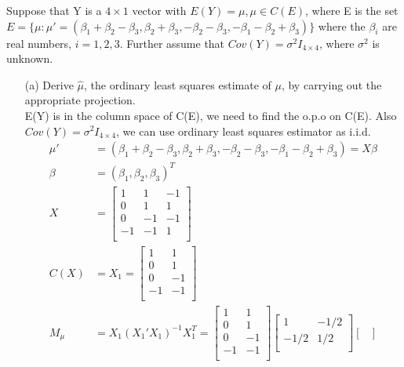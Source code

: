 Suppose that Y is a $4 \times 1$ vector with $E(Y ) = \mu, \mu \in C(E)$, where E is the set $E = \{ \mu: \mu' = (\beta_1 + \beta_2 - \beta_3, \beta_2 + \beta_3, -\beta_2 - \beta_3, -\beta_1-\beta_2 + \beta_3) \} $ where the $\beta_i$ are real numbers, $i = 1, 2, 3$. Further assume that $Cov(Y) = \sigma^2I_{4 \times 4}$, where $\sigma^2$ is unknown.\\
\begin{itemize}
    \item [(a)] Derive $\hat\mu$, the ordinary least squares estimate of $\mu$, by carrying out the
appropriate projection.\\
E(Y) is in the column space of C(E), we need to find the o.p.o on C(E). Also $Cov(Y) = \sigma^2 I_{4 \times 4}$, we can use ordinary least squares estimator as i.i.d.
\begin{align*}
    \mu' &= (\beta_1 + \beta_2 - \beta_3, \beta_2 + \beta_3, -\beta_2 - \beta_3, -\beta_1-\beta_2 + \beta_3) = X \beta\\
    \beta &= (\beta_1, \beta_2, \beta_3)^T\\
    X &= \begin{bmatrix}
           1  & 1 & -1  \\
           0 &  1 & 1\\
           0  & -1 & -1  \\
           -1 &  -1 & 1\\
         \end{bmatrix}\\
    C(X) &= X_1 = \begin{bmatrix}
           1  & 1   \\
           0 &  1 \\
           0  & -1  \\
           -1 &  -1 \\
         \end{bmatrix}\\
    M_{\mu} &= X_1(X_1'X_{1})^{-1} X_{1}^T = \begin{bmatrix}
           1  & 1   \\
           0 &  1 \\
           0  & -1  \\
           -1 &  -1 \\
         \end{bmatrix}\begin{bmatrix}
           1  & -1/2   \\
           -1/2 &  1/2 \\
         \end{bmatrix}\begin{bmatrix}

\end{bmatrix}
\end{align*}
\end{itemize}
